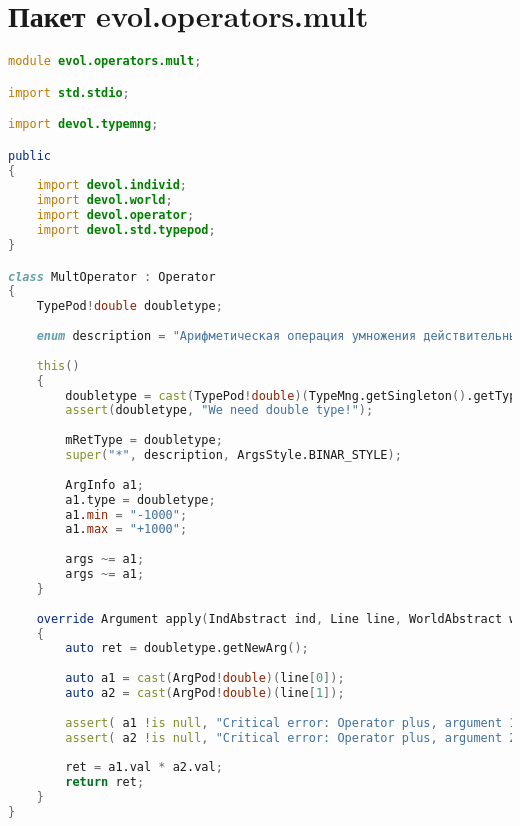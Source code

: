 \documentclass[russian,utf8,emptystyle]{eskdtext}
\begin{document}
\section{Пакет evol.operators.mult}
\begin{lstlisting}[language=D]
module evol.operators.mult;

import std.stdio;

import devol.typemng;

public
{
    import devol.individ;
    import devol.world;
    import devol.operator;
    import devol.std.typepod;
}

class MultOperator : Operator
{
    TypePod!double doubletype;
    
    enum description = "Арифметическая операция умножения действительных чисел.";
    
    this()
    {
        doubletype = cast(TypePod!double)(TypeMng.getSingleton().getType("Typedouble"));
        assert(doubletype, "We need double type!");
        
        mRetType = doubletype;
        super("*", description, ArgsStyle.BINAR_STYLE);
        
        ArgInfo a1;
        a1.type = doubletype;
        a1.min = "-1000";
        a1.max = "+1000";
        
        args ~= a1;
        args ~= a1;
    }
    
    override Argument apply(IndAbstract ind, Line line, WorldAbstract world)
    {
        auto ret = doubletype.getNewArg();
        
        auto a1 = cast(ArgPod!double)(line[0]);
        auto a2 = cast(ArgPod!double)(line[1]);
        
        assert( a1 !is null, "Critical error: Operator plus, argument 1 isn't a right value!");
        assert( a2 !is null, "Critical error: Operator plus, argument 2 isn't a right value!");
        
        ret = a1.val * a2.val;
        return ret;
    }   
}
\end{lstlisting}
\end{document}
